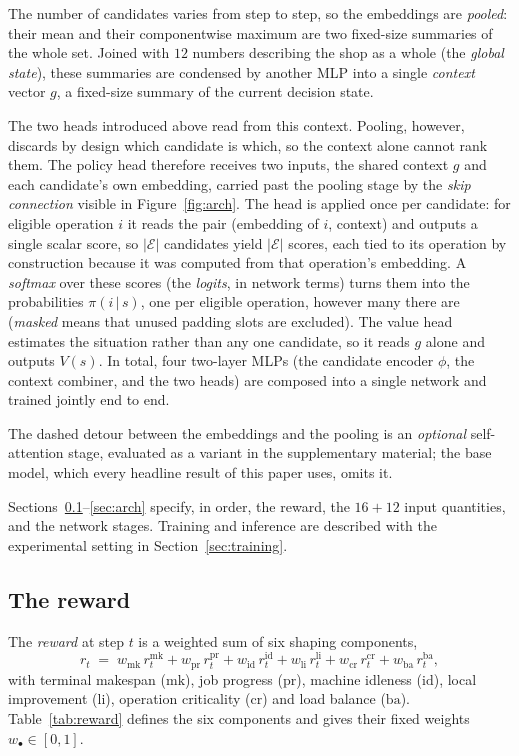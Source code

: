 \documentclass[preprint,12pt]{elsarticle}
\theoremstyle{definition}
\theoremstyle{remark}
\begin{document}
The number of candidates varies from step to step, so the embeddings
are \emph{pooled}: their mean and their componentwise maximum are two
fixed-size summaries of the whole set. Joined with $12$ numbers
describing the shop as a whole
(the \emph{global state}), these summaries are condensed by another
MLP into a single \emph{context} vector $g$, a fixed-size summary of
the current decision state.

The two heads introduced above read from this context. Pooling,
however, discards by design which candidate is which, so the context
alone cannot rank them. The policy head therefore
receives two inputs, the shared context $g$ and each candidate's own
embedding, carried past the pooling stage by the \emph{skip
connection} visible in Figure~\ref{fig:arch}. The head is applied
once per candidate: for eligible operation $i$ it reads the pair
(embedding of $i$, context) and outputs a single scalar score, so
$|\mathcal{E}|$ candidates yield $|\mathcal{E}|$ scores, each tied to
its operation by construction because it was computed from that
operation's embedding. A \emph{softmax} over these scores (the
\emph{logits}, in network terms) turns them into the probabilities
$\pi(i\,|\,s)$, one per eligible operation, however many there are
(\emph{masked} means that unused padding slots are excluded). The
value head estimates the situation rather than any one candidate, so
it reads $g$ alone and outputs $V(s)$. In total, four two-layer
MLPs (the candidate encoder $\phi$, the context combiner, and the
two heads) are composed into a single network and trained jointly end to
end.

The dashed detour between the embeddings and the pooling is an
\emph{optional} self-attention stage, evaluated as a variant in the
supplementary material; the base model, which every headline
result of this paper uses, omits it.

Sections~\ref{sec:mdp}--\ref{sec:arch} specify, in order, the
reward, the $16{+}12$ input quantities, and the network stages.
Training and
inference are described with the experimental setting in
Section~\ref{sec:training}.

\subsection{The reward}
\label{sec:mdp}

The \emph{reward} at step $t$ is a weighted sum of six shaping
components,
\begin{equation}
\label{eq:reward}
r_t \;=\; w_{\mathrm{mk}}\,r^{\mathrm{mk}}_t
      + w_{\mathrm{pr}}\,r^{\mathrm{pr}}_t
      + w_{\mathrm{id}}\,r^{\mathrm{id}}_t
      + w_{\mathrm{li}}\,r^{\mathrm{li}}_t
      + w_{\mathrm{cr}}\,r^{\mathrm{cr}}_t
      + w_{\mathrm{ba}}\,r^{\mathrm{ba}}_t,
\end{equation}
with terminal makespan ($\mathrm{mk}$), job progress ($\mathrm{pr}$),
machine idleness ($\mathrm{id}$), local improvement ($\mathrm{li}$),
operation criticality ($\mathrm{cr}$) and load balance
($\mathrm{ba}$). Table~\ref{tab:reward} defines the six components
and gives their fixed weights $w_{\bullet}\in[0,1]$.
\end{document}

